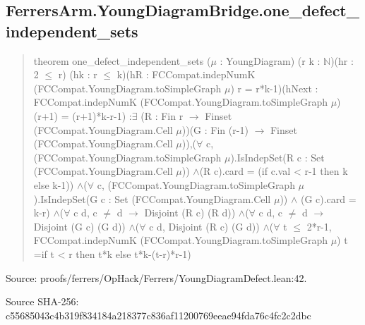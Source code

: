 \documentclass[11pt,a4paper]{article}
\begin{document}
\begin{samepage}
\subsection{FerrersArm.YoungDiagramBridge.one\_defect\_independent\_sets}
\begin{quote}\small\ttfamily theorem one\_defect\_independent\_sets (\ensuremath{\mu} : YoungDiagram) (r k : \ensuremath{\mathbb{N}})\newline     (hr : 2 \ensuremath{\leq} r) (hk : r \ensuremath{\leq} k)\newline     (hR : FCCompat.indepNumK (FCCompat.YoungDiagram.toSimpleGraph \ensuremath{\mu}) r = r*k-1)\newline     (hNext : FCCompat.indepNumK (FCCompat.YoungDiagram.toSimpleGraph \ensuremath{\mu})\newline       (r+1) = (r+1)*k-r-1) :\newline     \ensuremath{\exists} (R : Fin r \ensuremath{\to} Finset (FCCompat.YoungDiagram.Cell \ensuremath{\mu}))\newline       (G : Fin (r-1) \ensuremath{\to} Finset (FCCompat.YoungDiagram.Cell \ensuremath{\mu})),\newline       (\ensuremath{\forall} c, (FCCompat.YoungDiagram.toSimpleGraph \ensuremath{\mu}).IsIndepSet\newline         (R c : Set (FCCompat.YoungDiagram.Cell \ensuremath{\mu})) \ensuremath{\wedge}\newline         (R c).card = (if c.val < r-1 then k else k-1)) \ensuremath{\wedge}\newline       (\ensuremath{\forall} c, (FCCompat.YoungDiagram.toSimpleGraph \ensuremath{\mu}).IsIndepSet\newline         (G c : Set (FCCompat.YoungDiagram.Cell \ensuremath{\mu})) \ensuremath{\wedge} (G c).card = k-r) \ensuremath{\wedge}\newline       (\ensuremath{\forall} c d, c \ensuremath{\neq} d \ensuremath{\to} Disjoint (R c) (R d)) \ensuremath{\wedge}\newline       (\ensuremath{\forall} c d, c \ensuremath{\neq} d \ensuremath{\to} Disjoint (G c) (G d)) \ensuremath{\wedge}\newline       (\ensuremath{\forall} c d, Disjoint (R c) (G d)) \ensuremath{\wedge}\newline       (\ensuremath{\forall} t \ensuremath{\leq} 2*r-1, FCCompat.indepNumK (FCCompat.YoungDiagram.toSimpleGraph \ensuremath{\mu}) t =\newline         if t < r then t*k else t*k-(t-r)*r-1)\end{quote}
{\small Source: proofs/ferrers/OpHack/Ferrers/YoungDiagramDefect.lean:42.\par}

{\small Source SHA-256: c55685043c4b319f834184a218377c836af11200769eeae94fda76c4fc2c2dbc\par}

\end{samepage}
\end{document}
